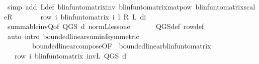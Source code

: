 \begin{isabellebody}
\ {\isacharparenleft}{\kern0pt}simp\ add{\isacharcolon}{\kern0pt}\ {\isasymP}\isactrlsub L{\isacharunderscore}{\kern0pt}def\ blinfun{\isacharunderscore}{\kern0pt}to{\isacharunderscore}{\kern0pt}matrix{\isacharunderscore}{\kern0pt}inv\ blinfun{\isacharunderscore}{\kern0pt}to{\isacharunderscore}{\kern0pt}matrix{\isacharunderscore}{\kern0pt}matpow\ blinfun{\isacharunderscore}{\kern0pt}to{\isacharunderscore}{\kern0pt}matrix{\isacharunderscore}{\kern0pt}scaleR{\isacharparenright}{\kern0pt}\isanewline
\ \ \isamarkupfalse%
\ \isamarkupfalse%
\ {\isachardoublequoteopen}{\isasymdots}\ {\isacharequal}{\kern0pt}\ row\ i\ {\isacharparenleft}{\kern0pt}blinfun{\isacharunderscore}{\kern0pt}to{\isacharunderscore}{\kern0pt}matrix\ {\isacharparenleft}{\kern0pt}{\isasymSum}i{\isachardot}{\kern0pt}\ {\isacharparenleft}{\kern0pt}l\ {\isacharasterisk}{\kern0pt}\isactrlsub R\ {\isasymP}\isactrlsub L\ d{\isacharprime}{\kern0pt}{\isacharparenright}{\kern0pt}{\isacharcircum}{\kern0pt}{\isacharcircum}{\kern0pt}i{\isacharparenright}{\kern0pt}{\isacharparenright}{\kern0pt}{\isachardoublequoteclose}\isanewline
\ \ \ \ \isamarkupfalse%
\ summable{\isacharunderscore}{\kern0pt}inv{\isacharunderscore}{\kern0pt}Q{\isacharbrackleft}{\kern0pt}of\ {\isachardoublequoteopen}Q{\isacharunderscore}{\kern0pt}GS\ d{\isacharprime}{\kern0pt}{\isachardoublequoteclose}{\isacharbrackright}{\kern0pt}\ norm{\isacharunderscore}{\kern0pt}{\isasymP}\isactrlsub L{\isacharunderscore}{\kern0pt}less{\isacharunderscore}{\kern0pt}one\ \isanewline
\ \ \ \ \isamarkupfalse%
\ Q{\isacharunderscore}{\kern0pt}GS{\isacharunderscore}{\kern0pt}def\ row{\isacharunderscore}{\kern0pt}def\isanewline
\ \ \ \ \isamarkupfalse%
\ {\isacharparenleft}{\kern0pt}auto\ intro{\isacharbang}{\kern0pt}{\isacharcolon}{\kern0pt}\ bounded{\isacharunderscore}{\kern0pt}linear{\isachardot}{\kern0pt}suminf{\isacharbrackleft}{\kern0pt}symmetric{\isacharbrackright}{\kern0pt}\ \isanewline
\ \ \ \ \ \ \ \ bounded{\isacharunderscore}{\kern0pt}linear{\isacharunderscore}{\kern0pt}compose{\isacharbrackleft}{\kern0pt}OF\ {\isacharunderscore}{\kern0pt}\ bounded{\isacharunderscore}{\kern0pt}linear{\isacharunderscore}{\kern0pt}blinfun{\isacharunderscore}{\kern0pt}to{\isacharunderscore}{\kern0pt}matrix{\isacharbrackright}{\kern0pt}{\isacharparenright}{\kern0pt}\isanewline
\ \ \isamarkupfalse%
\ \isamarkupfalse%
\ {\isachardoublequoteopen}{\isasymdots}\ {\isacharequal}{\kern0pt}\ row\ i\ {\isacharparenleft}{\kern0pt}blinfun{\isacharunderscore}{\kern0pt}to{\isacharunderscore}{\kern0pt}matrix\ {\isacharparenleft}{\kern0pt}inv\isactrlsub L\ {\isacharparenleft}{\kern0pt}Q{\isacharunderscore}{\kern0pt}GS\ d{\isacharprime}{\kern0pt}{\isacharparenright}{\kern0pt}{\isacharparenright}{\kern0pt}{\isacharparenright}{\kern0pt}{\isachardoublequoteclose}\isanewline

\end{isabellebody}
